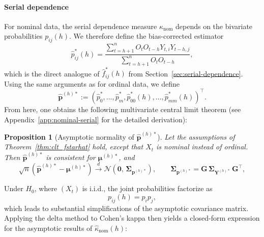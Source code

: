 ﻿\documentclass[12pt,a4paper]{scrreprt}
\newtheorem{proposition}[theorem]{Proposition}
\theoremstyle{definition}
\begin{document}
\paragraph{Serial dependence}
For nominal data, the serial dependence measure $\kappa_{\mathrm{nom}}$ depends on the bivariate 
probabilities $p_{ij}(h)$. We therefore define the bias-corrected estimator
\[
\hat{p}_{ij}^*(h)
=
\frac{\sum_{t=h+1}^{n}O_t O_{t-h}Y_{t,i}Y_{t-h,j}}
     {\sum_{t=h+1}^{n}O_t O_{t-h}},
\]
which is the direct analogue of $\hat f_{ij}^*(h)$ from Section~\ref{sec:serial-dependence}. Using the same arguments as for ordinal data,
we define 
\[\hat{\boldsymbol{p}}^{(h)*} := (\hat{p}^*_0, \ldots, \hat{p}^*_m, \hat{p}^*_{00}(h),  \ldots, \hat{p}^{*}_{mm}(h))^\top.\]
From here, one obtains the following multivariate central limit theorem (see Appendix~\ref{app:nominal-serial} for the detailed derivation):
\vspace{0.5cm}
\begin{proposition}[Asymptotic normality of $\hat{\boldsymbol{p}}^{(h)*}$]\label{prop:clt_phat_h}
Let the assumptions of Theorem~\ref{thm:clt_fstarhat} hold, except that $X_t$ is nominal instead of ordinal. Then 
$\hat{\boldsymbol{p}}^{(h)*}$ is consistent for $\boldsymbol{\mu}^{(h)*}$, 
and
\[
    \sqrt{n}\!\left(\hat{\boldsymbol{p}}^{(h)*} 
    - \boldsymbol{\mu}^{(h)*}\right)
    \xrightarrow{d} \mathcal{N}\!\left(\boldsymbol{0},\, 
    \boldsymbol{\Sigma}_{\boldsymbol{p}^{(h)*}}\right),
    \qquad
    \boldsymbol{\Sigma}_{\boldsymbol{p}^{(h)*}} 
    = \boldsymbol{G}\,\boldsymbol{\Sigma}_{\boldsymbol{Y}^{(h)*}}\,
    \boldsymbol{G}^\top,
\]
\end{proposition}\vspace{1cm}
\noindent Under $H_0$, where $(X_t)$ is i.i.d., the joint probabilities factorize as
\[
p_{ij}(h)=p_ip_j,
\]
which leads to substantial simplifications of the asymptotic covariance matrix. 
Applying the delta method to Cohen's kappa then yields a closed-form expression for 
the asymptotic results of $\hat{\kappa}_{\mathrm{nom}}(h)$:
\end{document}
